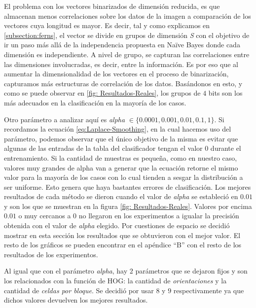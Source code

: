 	El problema con los vectores binarizados de dimensión reducida, es que almacenan menos correlaciones sobre los datos de la imagen a comparación de los vectores cuya longitud es mayor. Es decir, tal y como explicamos en \ref{subsection:ferns}, el vector se divide en grupos de dimensión \textit{S} con el objetivo de ir un paso más allá de la independencia propuesta en Na\"{i}ve Bayes donde cada dimensión es independiente. A nivel de grupo, se capturan las correlaciones entre las dimensiones involucradas, es decir, entre la información. Es por eso que al aumentar la dimensionalidad de los vectores en el proceso de binarización, capturamos más estructuras de correlación de los datos. Basándonos en esto, y como se puede observar en \ref{fig: Resultados-Reales}, los grupos de $4$ bits son los más adecuados en la clasificación en la mayoría de los casos.
	
	Otro parámetro a analizar aquí es \textit{alpha} $\in \{ 0.0001, 0.001, 0.01, 0.1, 1\}$. Si recordamos la ecuación \ref{eq:Laplace-Smoothing}, en la cual hacemos uso del parámetro, podemos observar que el único objetivo de la misma es evitar que algunas de las entradas de la tabla del clasificador tengan el valor $0$ durante el entrenamiento. Si la cantidad de muestras es pequeña, como en nuestro caso, valores muy grandes de alpha van a generar que la ecuación retorne el mismo valor para la mayoría de los casos con lo cual tienden a sesgar la distribución a ser uniforme.  Esto genera que haya bastantes errores de clasificación. Los mejores resultados de cada método se dieron cuando el valor de \textit{alpha} se estableció en $0.01$ y son los que se muestran en la figura \ref{fig: Resultados-Reales}. Valores por encima $0.01$ o muy cercanos a 0 no llegaron en los experimentos a igualar la precisión obtenida con el valor de \textit{alpha} elegido. Por cuestiones de espacio se decidió mostrar en esta sección los resultados que se obtuvieron con el mejor valor. El resto de los gráficos se pueden encontrar en el apéndice ``B'' con el resto de los resultados de los experimentos.
	
	Al igual que con el parámetro \textit{alpha}, hay $2$ parámetros que se dejaron fijos y son los relacionados con la función de HOG: la cantidad de \textit{orientaciones} y la cantidad de \textit{celdas por bloque}. Se decidió por usar $8$ y $9$ respectivamente ya que dichos valores devuelven los mejores resultados.
	
